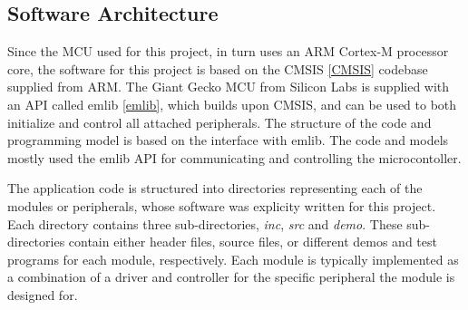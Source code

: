 \subsection{Software Architecture}

Since the MCU used for this project, in turn uses an ARM Cortex-M processor
core, the software for this project is based on the CMSIS \ref{CMSIS} codebase
supplied from ARM. The Giant Gecko MCU from Silicon Labs is supplied with an API
called emlib \ref{emlib}, which builds upon CMSIS, and can be used to both
initialize and control all attached peripherals. The structure of the code and
programming model is based on the interface with emlib. The code and models
mostly used the emlib API for communicating and controlling the microcontoller.



The application code is structured into directories representing each of the
modules or peripherals, whose software was explicity written for this project.
Each directory contains three sub-directories, \textit{inc}, \textit{src} and
\textit{demo}. These sub-directories contain either header files, source files,
or different demos and test programs for each module, respectively. Each module
is typically implemented as a combination of a driver and controller for the
specific peripheral the module is designed for.

